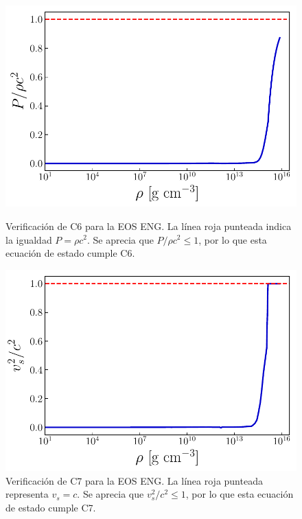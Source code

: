 \begin{figure}[H]
   \begin{minipage}[b]{.48\textwidth}
        \centering
        \includegraphics[width=1\textwidth]{figures/ECeng.pdf}
        \caption[Verificación de C6 para la EOS ENG]{Verificación de C6 para la EOS ENG. La línea roja punteada indica la igualdad $P=\rho c^2$. Se aprecia que $P/\rho c^2 \leq 1$, por lo que esta ecuación de estado cumple C6.}
        \label{DECeng}
    \end{minipage}
    \quad
    \begin{minipage}[b]{.48\textwidth}
        \centering
        \includegraphics[width=1\textwidth]{figures/SSeng.pdf}
        \caption[Verificación de C7 para la EOS ENG]{Verificación de C7 para la EOS ENG. La línea roja punteada representa $v_s=c$. Se aprecia que $v_s^2/c^2 \leq 1$, por lo que esta ecuación de estado cumple C7.}
        \label{SSCeng}
    \end{minipage}
\end{figure}



